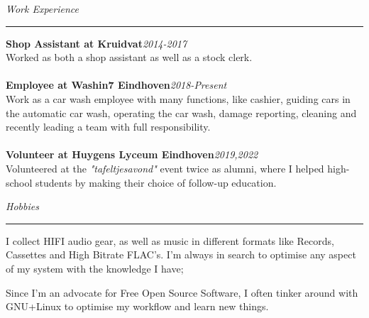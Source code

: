 \documentclass[12pt]{article}
\begin{document}
\textit{\huge{Work Experience}} \\
\noindent\hfil\rule{\textwidth}{.4pt}\hfil

\textbf{Shop Assistant at Kruidvat}\hfill \textit{2014-2017}\\
Worked as both a shop assistant as well as a stock clerk.\\
\hfill\\
\textbf{Employee at Washin7 Eindhoven}\hfill \textit{2018-Present}\\
Work as a car wash employee with many functions, like cashier, guiding cars in the automatic car wash, operating the car wash, damage reporting, cleaning and recently leading a team with full responsibility.\\
\hfill\\
\textbf{Volunteer at Huygens Lyceum Eindhoven}\hfill \textit{2019,2022}\\
Volunteered at the \textit{"tafeltjesavond"} event twice as alumni, where I helped high-school students by making their choice of follow-up education.
\vspace{0.5cm}

\textit{\huge{Hobbies}} \\
\noindent\hfil\rule{\textwidth}{.4pt}\hfill
\begin{compactitem}
    \item I collect HIFI audio gear, as well as music in different formats like Records, Cassettes and High Bitrate FLAC's. I'm always in search to optimise any aspect of my system with the knowledge I have;
    \item Since I'm an advocate for Free Open Source Software, I often tinker around with GNU+Linux to optimise my workflow and learn new things.
\end{compactitem}
\end{document}
